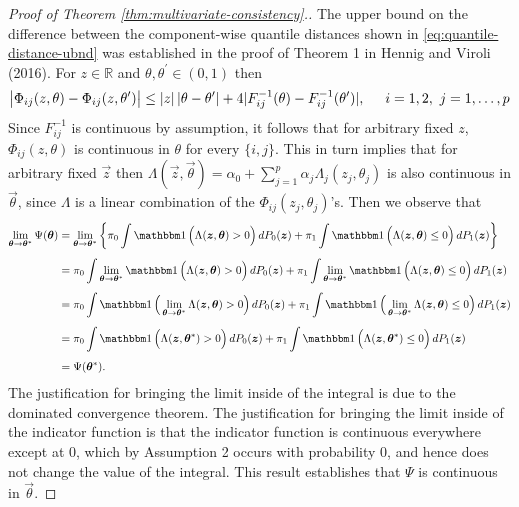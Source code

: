 \begin{proof}[Proof of Theorem \ref{thm:multivariate-consistency}.]
  The upper bound on the difference between the component-wise quantile
  distances shown in \ref{eq:quantile-distance-ubnd} was established in the
  proof of Theorem 1 in Hennig and Viroli (2016).  For $z \in \mathbb{R}$ and
  $\theta, \theta^{\prime} \in (0, 1)$ then
  \begin{equation}
    \label{eq:quantile-distance-ubnd}
    \big| \Phi_{ij}(z, \theta) - \Phi_{ij}(z, \theta^{\prime}) \big|
    \leq |z|\, | \theta - \theta^{\prime} | +
    4 | F_{ij}^{-1}(\theta) - F_{ij}^{-1}(\theta^{\prime}) |,
    \hspace{5mm} i = 1, 2,~ j = 1, \dots, p
  \end{equation}
  Since $F_{ij}^{-1}$ is continuous by assumption, it follows that for arbitrary
  fixed $z$, $\Phi_{ij}(z, \theta)$ is continuous in $\theta$ for every
  $\{i, j\}$.  This in turn implies that for arbitrary fixed $\vec{z}$ then
  $\Lambda(\vec{z}, \vec{\theta}) = \alpha_0 + \sum_{j=1}^p \alpha_j
  \Lambda_j(z_j, \theta_j)$ is also continuous in $\vec{\theta}$, since
  $\Lambda$ is a linear combination of the $\Phi_{ij}(z_j, \theta_j)$'s.  Then
  we observe that
  \begin{align}
    \label{eq:multivariate-phi-continuity}
    \begin{split}
      \limtheta \Psi(\vec{\theta})
      & = \limtheta \left\{
        \pi_0 \int \ind\Big( \Lambda(\vec{z}, \vec{\theta}) > 0 \Big)\, dP_0(\vec{z}) +
        \pi_1 \int \ind\Big(\Lambda(\vec{z}, \vec{\theta}) \leq 0 \Big)\, dP_1(\vec{z})
      \right\} \\[1ex]
      & = \pi_0 \int \limtheta \ind\Big( \Lambda(\vec{z}, \vec{\theta}) > 0 \Big)\, dP_0(\vec{z})
      + \pi_1 \int \limtheta \ind\Big(\Lambda(\vec{z}, \vec{\theta}) \leq 0 \Big)\, dP_1(\vec{z})
      \\[1ex]
      & = \pi_0 \int \ind \Big( \limtheta \Lambda(\vec{z}, \vec{\theta}) > 0 \Big)\, dP_0(\vec{z})
      + \pi_1 \int \ind \Big( \limtheta \Lambda(\vec{z}, \vec{\theta}) \leq 0 \Big)\, dP_1(\vec{z})
      \\[1ex]
      & = \pi_0 \int \ind \Big( \Lambda(\vec{z}, \vec{\theta}^{*}) > 0 \Big)\, dP_0(\vec{z})
      + \pi_1 \int \ind \Big( \Lambda(\vec{z}, \vec{\theta}^{*}) \leq 0 \Big)\, dP_1(\vec{z})
      \\[1ex]
      & = \Psi(\vec{\theta}^{*}).
    \end{split}
  \end{align}
  The justification for bringing the limit inside of the integral is due to the
  dominated convergence theorem.  The justification for bringing the limit
  inside of the indicator function is that the indicator function is continuous
  everywhere except at 0, which by Assumption 2 occurs with probability 0, and
  hence does not change the value of the integral.  This result establishes that
  $\Psi$ is continuous in $\vec{\theta}$.


\end{proof}

